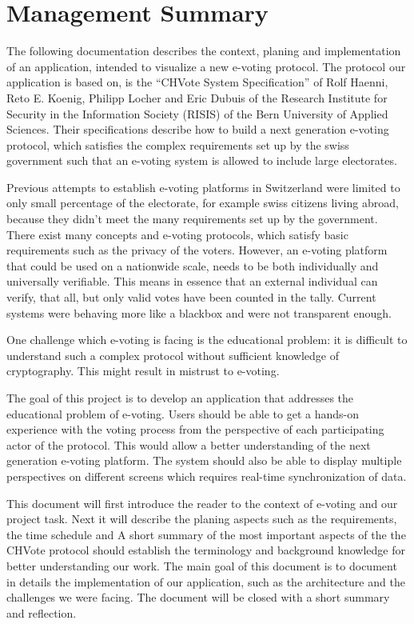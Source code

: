 \chapter*{Management Summary}
The following documentation describes the context, planing and implementation of an application, intended to visualize a new e-voting protocol. The protocol our application is based on, is the "`CHVote System Specification"' of Rolf Haenni, Reto E. Koenig, Philipp Locher and Eric Dubuis of the Research Institute for Security in the Information Society (RISIS) of the Bern University of Applied Sciences. Their specifications describe how to build a next generation e-voting protocol, which satisfies the complex requirements set up by the swiss government such that an e-voting system is allowed to include large electorates.

Previous attempts to establish e-voting platforms in Switzerland were limited to only small percentage of the electorate, for example swiss citizens living abroad, because they didn't meet the many requirements set up by the government. There exist many concepts and e-voting protocols, which satisfy basic requirements such as the privacy of the voters. However, an e-voting platform that could be used on a nationwide scale, needs to be both individually and universally verifiable. This means in essence that an external individual can verify, that all, but only valid votes have been counted in the tally. Current systems were behaving more like a blackbox and were not transparent enough.

One challenge which e-voting is facing is the educational problem: it is difficult to understand such a complex protocol without sufficient knowledge of cryptography. This might result in mistrust to e-voting. 

The goal of this project is to develop an application that addresses the educational problem of e-voting. Users should be able to get a hands-on experience with the voting process from the perspective of each participating actor of the protocol. This would allow a better understanding of the next generation e-voting platform. The system should also be able to display multiple perspectives on different screens which requires real-time synchronization of data.

This document will first introduce the reader to the context of e-voting and our project task. 
Next it will describe the planing aspects such as the requirements, the time schedule and 
A short summary of the most important aspects of the the CHVote protocol should establish the terminology and background knowledge for better understanding our work. The main goal of this document is to document in details the implementation of our application, such as the architecture and the challenges we were facing. The document will be closed with a short summary and reflection.